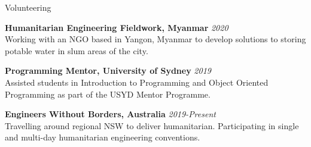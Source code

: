 \documentclass{resume} %
\begin{document}
\begin{rSection}{Volunteering}

{\bf Humanitarian Engineering Fieldwork, Myanmar} \hfill {\em 2020}
\\Working with an NGO based in Yangon, Myanmar to develop solutions to storing potable water in slum areas of the city.

{\bf Programming Mentor, University of Sydney} \hfill {\em 2019}
\\Assisted students in Introduction to Programming and Object Oriented Programming as part of the USYD Mentor Programme.

{\bf Engineers Without Borders, Australia} \hfill {\em 2019-Present}
\\Travelling around regional NSW to deliver humanitarian. Participating in single and multi-day humanitarian engineering conventions.

\end{rSection}
\end{document}
